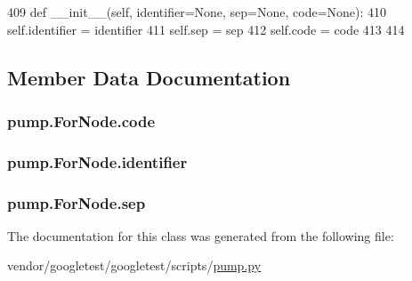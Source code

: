 \begin{DoxyCode}
409   \textcolor{keyword}{def }\_\_init\_\_(self, identifier=None, sep=None, code=None):
410     self.identifier = identifier
411     self.sep = sep
412     self.code = code
413 
414 
\end{DoxyCode}


\subsection{Member Data Documentation}
\subsubsection[{\texorpdfstring{code}{code}}]{\setlength{\rightskip}{0pt plus 5cm}pump.\+For\+Node.\+code}\hypertarget{classpump_1_1ForNode_afdb5f4f2a3bc772bbc6ea777dfde898e}{}\label{classpump_1_1ForNode_afdb5f4f2a3bc772bbc6ea777dfde898e}
\subsubsection[{\texorpdfstring{identifier}{identifier}}]{\setlength{\rightskip}{0pt plus 5cm}pump.\+For\+Node.\+identifier}\hypertarget{classpump_1_1ForNode_a2444199e135e43696b3a006bd0d38982}{}\label{classpump_1_1ForNode_a2444199e135e43696b3a006bd0d38982}
\subsubsection[{\texorpdfstring{sep}{sep}}]{\setlength{\rightskip}{0pt plus 5cm}pump.\+For\+Node.\+sep}\hypertarget{classpump_1_1ForNode_a06b493278b3c1ad53363a2bcc3b8efb3}{}\label{classpump_1_1ForNode_a06b493278b3c1ad53363a2bcc3b8efb3}


The documentation for this class was generated from the following file\+:\begin{DoxyCompactItemize}
\item 
vendor/googletest/googletest/scripts/\hyperlink{pump_8py}{pump.\+py}\end{DoxyCompactItemize}
